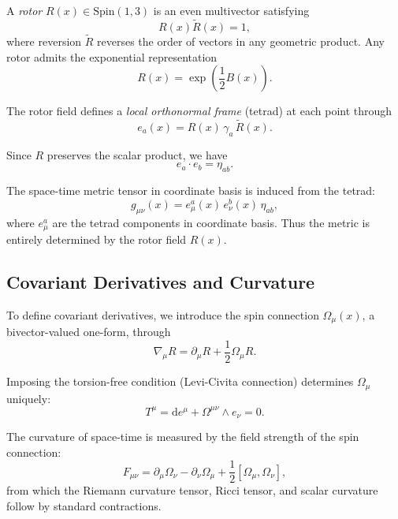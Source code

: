\documentclass[11pt,a4paper]{article}
\numberwithin{equation}{section}
\theoremstyle{plain}
\theoremstyle{definition}
\theoremstyle{remark}
\newcommand{\dd}{\mathrm{d}}
\begin{document}
A \emph{rotor} $R(x) \in \mathrm{Spin}(1,3)$ is an even multivector satisfying
\begin{equation}
R(x)\widetilde{R}(x) = 1,
\end{equation}
where reversion $\widetilde{R}$ reverses the order of vectors in any geometric product. Any rotor admits the exponential representation
\begin{equation}
R(x) = \exp\left(\frac{1}{2}B(x)\right).
\label{eq:rotor-exp}
\end{equation}

The rotor field defines a \emph{local orthonormal frame} (tetrad) at each point through
\begin{equation}
e_a(x) = R(x)\, \gamma_a\, \widetilde{R}(x).
\label{eq:tetrad}
\end{equation}

Since $R$ preserves the scalar product, we have
\begin{equation}
e_a \cdot e_b = \eta_{ab}.
\end{equation}

The space-time metric tensor in coordinate basis is induced from the tetrad:
\begin{equation}
g_{\mu\nu}(x) = e_\mu^a(x)\, e_\nu^b(x)\, \eta_{ab},
\label{eq:metric}
\end{equation}
where $e_\mu^a$ are the tetrad components in coordinate basis. Thus the metric is entirely determined by the rotor field $R(x)$.

\subsection{Covariant Derivatives and Curvature}

To define covariant derivatives, we introduce the spin connection $\Omega_\mu(x)$, a bivector-valued one-form, through
\begin{equation}
\nabla_\mu R = \partial_\mu R + \frac{1}{2}\Omega_\mu R.
\label{eq:covariant-deriv}
\end{equation}

Imposing the torsion-free condition (Levi-Civita connection) determines $\Omega_\mu$ uniquely:
\begin{equation}
T^\mu = \dd e^\mu + \Omega^{\mu\nu} \wedge e_\nu = 0.
\end{equation}

The curvature of space-time is measured by the field strength of the spin connection:
\begin{equation}
F_{\mu\nu} = \partial_\mu \Omega_\nu - \partial_\nu \Omega_\mu + \frac{1}{2}[\Omega_\mu, \Omega_\nu],
\label{eq:curvature}
\end{equation}
from which the Riemann curvature tensor, Ricci tensor, and scalar curvature follow by standard contractions.
\end{document}
